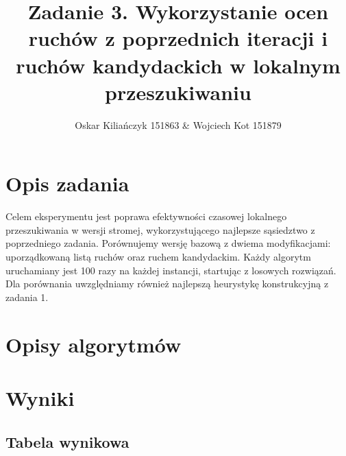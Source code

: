 \documentclass[11pt]{article}
\title{Zadanie 3. Wykorzystanie ocen ruchów z poprzednich iteracji i ruchów
kandydackich w lokalnym przeszukiwaniu}
\author{Oskar Kiliańczyk 151863 \& Wojciech Kot 151879}
\date{}
\begin{document}
\maketitle
\newpage

\section{Opis zadania}\label{sec:opis-zadania}

Celem eksperymentu jest poprawa efektywności czasowej lokalnego przeszukiwania w wersji stromej, wykorzystującego najlepsze sąsiedztwo z poprzedniego zadania.
Porównujemy wersję bazową z dwiema modyfikacjami: uporządkowaną listą ruchów oraz ruchem kandydackim.
Każdy algorytm uruchamiany jest 100 razy na każdej instancji, startując z losowych rozwiązań.
Dla porównania uwzględniamy również najlepszą heurystykę konstrukcyjną z zadania 1.

\section{Opisy algorytmów}\label{sec:opisy-alg}


\section{Wyniki}\label{sec:wyniki}

\subsection{Tabela wynikowa}\label{subsec:tabela-wynikowa}

\begin{table}[ht]
\centering
{}
\caption{Wyniki dla \texttt{kroA200} z naszym algorytmem}
\end{table}
\end{document}
